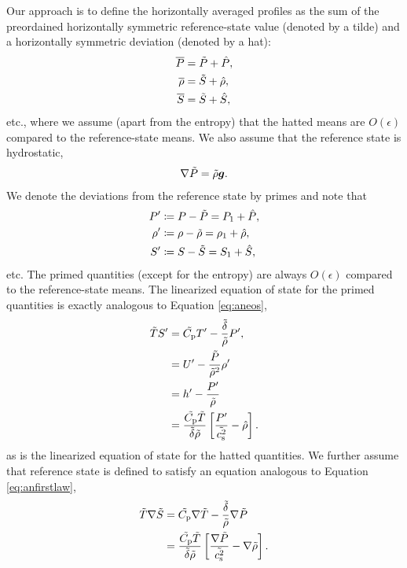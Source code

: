 \documentclass[12pt]{article}
\begin{document}
Our approach is to define the horizontally averaged profiles as the sum of the preordained horizontally symmetric reference-state value (denoted by a tilde) and a horizontally symmetric deviation (denoted by a hat):
\begin{align}
	\overline{P} &= \tilde{P} + \hat{P},\\
	\overline{\rho} &= \tilde{S} + \hat{\rho},\\
	\overline{S} &=  \tilde{S} + \hat{S},
\end{align}
etc., where we assume (apart from the entropy) that the hatted means are $O(\epsilon)$ compared to the reference-state means. We also assume that the reference state is hydrostatic,
\begin{align}\label{eq:refhydro}
	\nabla \tilde{P} = \tilde{\rho}\bm{g}.
\end{align}
We denote the deviations from the reference state by primes and note that 
\begin{align}
	P^\prime & \coloneqq P - \tilde{P} = P_1 + \hat{P},\\
	\rho^\prime & \coloneqq \rho - \tilde{\rho} = \rho_1 + \hat{\rho},\\
	 S^\prime & \coloneqq S -  \tilde{S} =  S_1 + \hat{S},
\end{align}
etc. The primed quantities (except for the entropy) are always $O(\epsilon)$ compared to the reference-state means. The linearized equation of state for the primed quantities is exactly analogous to Equation \eqref{eq:aneos},
\begin{subequations}\label{eq:aneosref}
	\begin{align}
		\tilde{T} S^\prime &= \tilde{C_{\rm{p}}} T^\prime - \frac{\tilde{\delta}}{\tilde{\rho}} P^\prime,\\
		&= U^\prime - \frac{\tilde{P}}{\tilde{\rho}^2}\rho^\prime \\
	&= h^\prime - \frac{P^\prime }{\tilde{\rho}}\\
		&= \frac{\tilde{C_{\rm{p}}} \tilde{T}}{\tilde{\delta}\tilde{\rho}}\left[\frac{P^\prime}{\tilde{c_{\rm s}^2}}-\hat{\rho}\right].
	\end{align}
\end{subequations}
as is the linearized equation of state for the hatted quantities. We further assume that reference state is defined to satisfy an equation analogous to Equation \eqref{eq:anfirstlaw},
\begin{subequations}\label{eq:anfirstlawref}
	\begin{align}
		\tilde{T}\nabla\tilde{S} &= \tilde{C_{\rm{p}}}\nabla\tilde{T} - \frac{\tilde{\delta}}{\tilde{\rho}}\nabla\tilde{P} \\
		&= \frac{\tilde{C_{\rm{p}}}\tilde{T}}{\tilde{\delta}\tilde{\rho}}\left[\frac{\nabla\tilde{P}}{\tilde{c_{\rm s}^2}}-\nabla\tilde{\rho}\right].
	\end{align}
\end{subequations}
\end{document}
